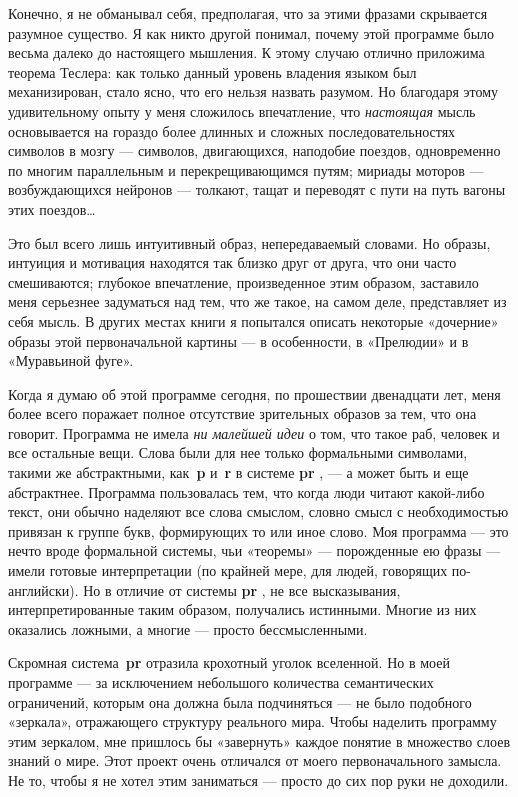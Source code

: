 \documentclass[../main.tex]{subfiles}
\begin{document}
Конечно, я не обманывал себя, предполагая, что за этими фразами скрывается разумное существо. Я как никто другой понимал, почему этой программе было весьма далеко до настоящего мышления. К этому случаю отлично приложима теорема Теслера: как только данный уровень владения языком был механизирован, стало ясно, что его нельзя назвать разумом. Но благодаря этому удивительному опыту у меня сложилось впечатление, что \emph{настоящая} мысль основывается на гораздо более длинных и сложных последовательностях символов в мозгу --- символов, двигающихся, наподобие поездов, одновременно по многим параллельным и перекрещивающимся путям; мириады моторов --- возбуждающихся нейронов --- толкают, тащат и переводят с пути на путь вагоны этих поездов\ldots{}

Это был всего лишь интуитивный образ, непередаваемый словами. Но образы, интуиция и мотивация находятся так близко друг от друга, что они часто смешиваются; глубокое впечатление, произведенное этим образом, заставило меня серьезнее задуматься над тем, что же такое, на самом деле, представляет из себя мысль. В других местах книги я попытался описать некоторые «дочерние» образы этой первоначальной картины --- в особенности, в «Прелюдии» и в «Муравьиной фуге».

Когда я думаю об этой программе сегодня, по прошествии двенадцати лет, меня более всего поражает полное отсутствие зрительных образов за тем, что она говорит. Программа не имела \emph{ни малейшей идеи} о том, что такое раб, человек и все остальные вещи. Слова были для нее только формальными символами, такими же абстрактными, как~\textbf{p} и~\textbf{r} в системе \textbf{pr} , --- а может быть и еще абстрактнее. Программа пользовалась тем, что когда люди читают какой-либо текст, они обычно наделяют все слова смыслом, словно смысл с необходимостью привязан к группе букв, формирующих то или иное слово. Моя программа --- это нечто вроде формальной системы, чьи «теоремы» --- порожденные ею фразы --- имели готовые интерпретации (по крайней мере, для людей, говорящих по-английски). Но в отличие от системы \textbf{pr} , не все высказывания, интерпретированные таким образом, получались истинными. Многие из них оказались ложными, а многие --- просто бессмысленными.

Скромная система~\textbf{pr} отразила крохотный уголок вселенной. Но в моей программе --- за исключением небольшого количества семантических ограничений, которым она должна была подчиняться --- не было подобного «зеркала», отражающего структуру реального мира. Чтобы наделить программу этим зеркалом, мне пришлось бы «завернуть» каждое понятие в множество слоев знаний о мире. Этот проект очень отличался от моего первоначального замысла. Не то, чтобы я не хотел этим заниматься --- просто до сих пор руки не доходили.
\end{document}
